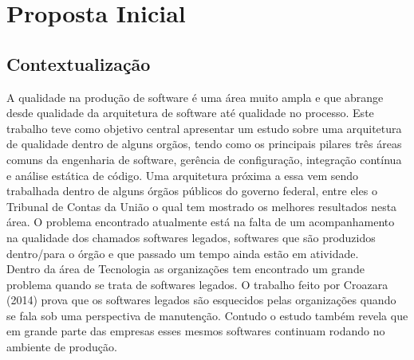 
\chapter[Proposta Inicial]{Proposta Inicial}
	


\section{Contextualização}
	A qualidade na produção de software é uma área muito ampla e que abrange desde qualidade da arquitetura de software até qualidade no processo. Este trabalho teve como objetivo central apresentar um estudo sobre uma arquitetura de qualidade dentro de alguns orgãos, tendo como os principais pilares três áreas comuns da engenharia de software, gerência de configuração, integração contínua e análise estática de código. Uma arquitetura próxima a essa vem sendo trabalhada dentro de alguns órgãos públicos do governo federal, entre eles o Tribunal de Contas da União o qual tem mostrado os melhores resultados nesta área. O problema encontrado atualmente está na falta de um acompanhamento na qualidade dos chamados softwares legados, softwares que são produzidos dentro/para o órgão e que passado um tempo ainda estão em atividade.
	\\Dentro da área de Tecnologia as organizações tem encontrado um grande problema quando se trata de softwares legados. O trabalho feito por Croazara (2014) prova que os softwares legados são esquecidos pelas organizações quando se fala sob uma perspectiva de manutenção. Contudo o estudo também revela que em grande parte das empresas esses mesmos softwares continuam rodando no ambiente de produção.
	
	
	
